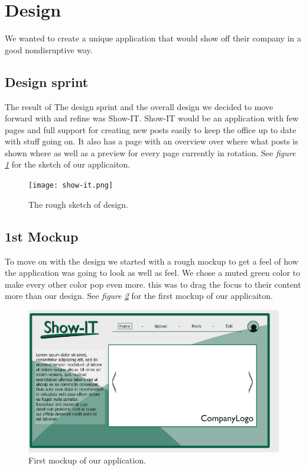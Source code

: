 \documentclass[12pt]{article}
\begin{document}
\section{Design}
We wanted to create a unique application that would show off their company in a good nondisruptive way.
\subsection{Design sprint}
The result of The design sprint and the overall design we decided to move forward with and refine was Show-IT. Show-IT would be an application
with few pages and full support for creating new posts easily to keep the office up to date with stuff going on. 
It also has a page with an overview over where what posts is shown where as well as a preview for every page currently in rotation.
    See \textit {figure \ref{fig:SDB}} for the sketch of our applicaiton.
\begin{figure} [!htbp]
    \texttt{[image: show-it.png]}
        \caption {The rough sketch of design.}
    \label{fig:SDB}
\end{figure}

    \subsection{1st Mockup}
To move on with the design we started with a rough mockup to get a feel of how the application was going to look
as well as feel. We chose a muted green color to make every other color pop even more. this was to drag the focus 
to their content more than our design. 
    See \textit {figure \ref{fig:MU}} for the first mockup of our applicaiton.
\begin{figure} [!htbp]
    \includegraphics[scale=0.55]{1stMockup_Show-IT.png} 
        \caption{First mockup of our application.}
    \label{fig:MU}
\end{figure}
\end{document}
